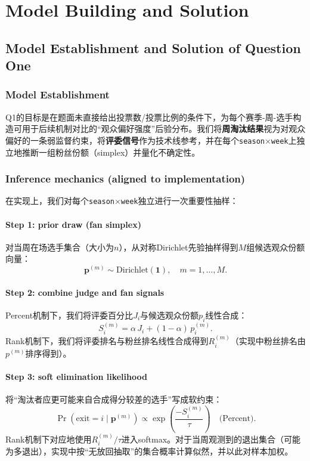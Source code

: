\newpage	
\section{Model Building and Solution}

\subsection{Model Establishment and Solution of Question One}
\subsubsection{Model Establishment}
Q1的目标是在题面未直接给出投票数/投票比例的条件下，为每个赛季-周-选手构造可用于后续机制对比的“观众偏好强度”后验分布。我们将\textbf{周淘汰结果}视为对观众偏好的一条弱监督约束，将\textbf{评委信号}作为技术线参考，并在每个\texttt{season$\times$week}上独立地推断一组粉丝份额（simplex）并量化不确定性。

\subsubsection{Inference mechanics (aligned to implementation)}
在实现上，我们对每个\texttt{season$\times$week}独立进行一次重要性抽样：

\paragraph{Step 1: prior draw (fan simplex)}
对当周在场选手集合（大小为$n$），从对称Dirichlet先验抽样得到$M$组候选观众份额向量：
\begin{equation}
\mathbf{p}^{(m)} \sim \mathrm{Dirichlet}(\mathbf{1}),\quad m=1,\dots,M.
\end{equation}

\paragraph{Step 2: combine judge and fan signals}
Percent机制下，我们将评委百分比$J_i$与候选观众份额$p_i$线性合成：
\begin{equation}
S_i^{(m)} = \alpha\,J_i + (1-\alpha)\,p^{(m)}_i.
\end{equation}
Rank机制下，我们将评委排名与粉丝排名线性合成得到$R_i^{(m)}$（实现中粉丝排名由$p^{(m)}$排序得到）。

\paragraph{Step 3: soft elimination likelihood}
将“淘汰者应更可能来自合成得分较差的选手”写成软约束：
\begin{equation}
\Pr(\text{exit}=i\mid \mathbf{p}^{(m)}) \propto \exp\left(\frac{-S_i^{(m)}}{\tau}\right)\quad\text{(Percent)}.
\end{equation}
Rank机制下对应地使用$R_i^{(m)}/\tau$进入softmax。对于当周观测到的退出集合（可能为多退出），实现中按“无放回抽取”的集合概率计算似然，并以此对样本加权。

